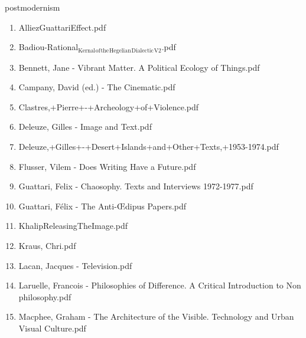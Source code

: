 \documentclass[11pt]{article}
\begin{document}
\item postmodernism
\label{sec-1-1-1-1-11-29}
\begin{enumerate}
\item AlliezGuattariEffect.pdf
\label{sec-1-1-1-1-11-29-1}

\item Badiou-Rational$_{\text{Kernal}}$$_{\text{of}}$$_{\text{the}}$$_{\text{Hegelian}}$$_{\text{Dialectic}}$$_{\text{V2}}$.pdf
\label{sec-1-1-1-1-11-29-2}

\item Bennett, Jane - Vibrant Matter. A Political Ecology of Things.pdf
\label{sec-1-1-1-1-11-29-3}

\item Campany, David (ed.) - The Cinematic.pdf
\label{sec-1-1-1-1-11-29-4}

\item Clastres,+Pierre+-+Archeology+of+Violence.pdf
\label{sec-1-1-1-1-11-29-5}

\item Deleuze, Gilles - Image and Text.pdf
\label{sec-1-1-1-1-11-29-6}

\item Deleuze,+Gilles+-+Desert+Islands+and+Other+Texts,+1953-1974.pdf
\label{sec-1-1-1-1-11-29-7}

\item Flusser, Vilem - Does Writing Have a Future.pdf
\label{sec-1-1-1-1-11-29-8}

\item Guattari, Felix - Chaosophy. Texts and Interviews 1972-1977.pdf
\label{sec-1-1-1-1-11-29-9}

\item Guattari, Félix - The Anti-Œdipus Papers.pdf
\label{sec-1-1-1-1-11-29-10}

\item KhalipReleasingTheImage.pdf
\label{sec-1-1-1-1-11-29-11}

\item Kraus, Chri.pdf
\label{sec-1-1-1-1-11-29-12}

\item Lacan, Jacques - Television.pdf
\label{sec-1-1-1-1-11-29-13}

\item Laruelle, Francois - Philosophies of Difference. A Critical Introduction to Non philosophy.pdf
\label{sec-1-1-1-1-11-29-14}

\item Macphee, Graham - The Architecture of the Visible. Technology and Urban Visual Culture.pdf
\label{sec-1-1-1-1-11-29-15}


\end{enumerate}
\end{document}
